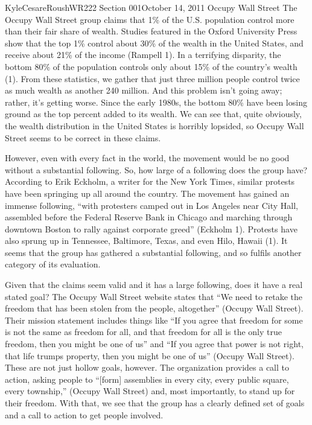 \documentclass[12pt,letterpaper]{article}
\begin{document}
\begin{mla}{Kyle}{Cesare}{Roush}{WR222 Section 001}{October 14, 2011}{
Occupy Wall Street}
The Occupy Wall Street group claims that 1\% of the U.S. population control more
than their fair share of wealth.  Studies featured in the Oxford University
Press show that the top 1\% control about 30\% of the wealth in the United
States, and receive about 21\% of the income (Rampell 1).  In a terrifying
disparity, the bottom 80\% of the population controls only about 15\% of the
country's wealth (1).  From these statistics, we gather that just three million
people control twice as much wealth as another 240 million.  And this problem
isn't going away; rather, it's getting worse.  Since the early 1980s, the bottom
80\% have been losing ground as the top percent added to its wealth.  We can see
that, quite obviously, the wealth distribution in the United States is horribly
lopsided, so Occupy Wall Street seems to be correct in these claims.

However, even with every fact in the world, the movement would be no good
without a substantial following.  So, how large of a following does the group
have?  According to Erik Eckholm, a writer for the New York Times, similar
protests have been springing up all around the country.  The movement has gained
an immense following, ``with protesters camped out in Los Angeles near City
Hall, assembled before the Federal Reserve Bank in Chicago and marching through
downtown Boston to rally against corporate greed'' (Eckholm 1).  Protests have
also sprung up in Tennessee, Baltimore, Texas, and even Hilo, Hawaii (1).  It
seems that the group has gathered a substantial following, and so fulfils
another category of its evaluation.

Given that the claims seem valid and it has a large following, does it have a
real stated goal?  The Occupy Wall Street website states that ``We need to
retake the freedom that has been stolen from the people, altogether'' (Occupy
Wall Street).  Their mission statement includes things like ``If you agree that
freedom for some is not the same as freedom for all, and that freedom for all is
the only true freedom, then you might be one of us'' and ``If you agree that
power is not right, that life trumps property, then you might be one of us''
(Occupy Wall Street).  These are not just hollow goals, however.  The
organization provides a call to action, asking people to ``[form] assemblies in
every city, every public square, every township,'' (Occupy Wall Street) and,
most importantly, to stand up for their freedom.  With that, we see that the
group has a clearly defined set of goals and a call to action to get people
involved.


\end{mla}
\end{document}
